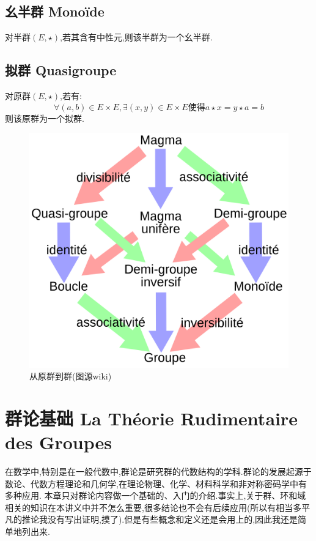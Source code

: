 \documentclass[12pt, a4paper, oneside]{ctexbook}
\begin{document}
  \subsection{幺半群 Monoïde}
  对半群$(E,\star)$,若其含有中性元,则该半群为一个幺半群.

  \subsection{拟群 Quasigroupe}
  对原群$(E,\star)$,若有:
  $$
  \forall (a,b)\in E\times E, \exists (x,y)\in E\times E\text{使得}a\star x=y\star a=b
  $$则该原群为一个拟群.


  \begin{figure}[H]
    \centering
    \includegraphics[scale=0.13]{magma_groupe.png}
    \caption{从原群到群(图源wiki)}
    \label{myref:groupe_magma}
  \end{figure}

  \section{群论基础 La Théorie Rudimentaire des Groupes}
  在数学中,特别是在一般代数中,群论是研究群的代数结构的学科.群论的发展起源于数论、代数方程理论和几何学,在理论物理、化学、材料科学和非对称密码学中有多种应用.
  本章只对群论内容做一个基础的、入门的介绍.事实上,关于群、环和域相关的知识在本讲义中并不怎么重要,很多结论也不会有后续应用(所以有相当多平凡的推论我没有写出证明,摸了).但是有些概念和定义还是会用上的,因此我还是简单地列出来.
\end{document}
